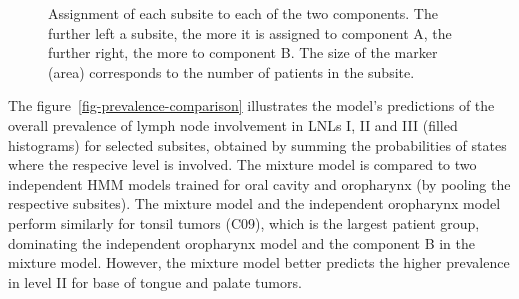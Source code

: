 \documentclass[11pt,twocolumn,twoside]{article}
\begin{document}
\begin{figure}


\caption{\label{fig-cluster-assignments}Assignment of each subsite to
each of the two components. The further left a subsite, the more it is
assigned to component A, the further right, the more to component B. The
size of the marker (area) corresponds to the number of patients in the
subsite.}

\end{figure}%

The figure~\ref{fig-prevalence-comparison} illustrates the model's
predictions of the overall prevalence of lymph node involvement in LNLs
I, II and III (filled histograms) for selected subsites, obtained by
summing the probabilities of states where the respecive level is
involved. The mixture model is compared to two independent HMM models
trained for oral cavity and oropharynx (by pooling the respective
subsites). The mixture model and the independent oropharynx model
perform similarly for tonsil tumors (C09), which is the largest patient
group, dominating the independent oropharynx model and the component B
in the mixture model. However, the mixture model better predicts the
higher prevalence in level II for base of tongue and palate tumors.
\end{document}
